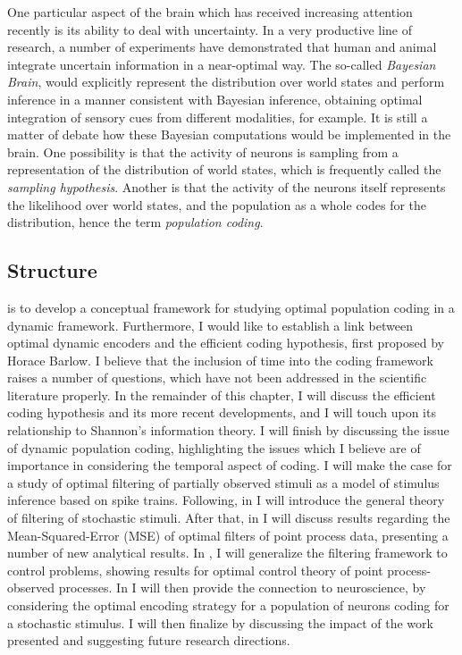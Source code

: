 One particular aspect of the brain which has received increasing attention recently is its ability to deal with uncertainty. In a very productive line of research, a number of experiments have demonstrated that human and animal integrate uncertain information in a near-optimal way. The so-called {\em Bayesian Brain},\cite{Knill2004} would explicitly represent the distribution over world states and perform inference in a manner consistent with Bayesian inference, obtaining optimal integration of sensory cues from different modalities, for example. It is still a matter of debate how these Bayesian computations would be implemented in the brain. One possibility is that the activity of neurons is sampling from a representation of the distribution of world states,\cite{Berkes2011} which is frequently called the {\em sampling hypothesis}. Another is that the activity of the neurons itself represents the likelihood over world states,\cite{Ma2006} and the population as a whole codes for the distribution, hence the term {\em population coding}.\par

\subsection*{Structure}
 is to develop a conceptual framework for studying optimal population coding in a dynamic framework. Furthermore, I would like to establish a link between optimal dynamic encoders and the efficient coding hypothesis, first proposed by Horace Barlow.\cite{Barlow1961} I believe that the inclusion of time into the coding framework raises a number of questions, which have not been addressed in the scientific literature properly. In the remainder of this chapter, I will discuss the efficient coding hypothesis and its more recent developments, and I will touch upon its relationship to Shannon's information theory.\cite{Shannon1948} I will finish by discussing the issue of dynamic population coding, highlighting the issues which I believe are of importance in considering the temporal aspect of coding. I will make the case for a study of optimal filtering of partially observed stimuli as a model of stimulus inference based on spike trains. Following, in   I will introduce the general theory of filtering of stochastic stimuli. After that, in  I will discuss results regarding the Mean-Squared-Error (MSE) of optimal filters of point process data, presenting a number of new analytical results. In , I will generalize the filtering framework to control problems, showing results for optimal control theory of point process-observed processes. In  I will then provide the connection to neuroscience, by considering the optimal encoding strategy for a population of neurons coding for a stochastic stimulus. I will then finalize by discussing the impact of the work presented and suggesting future research directions.\par

